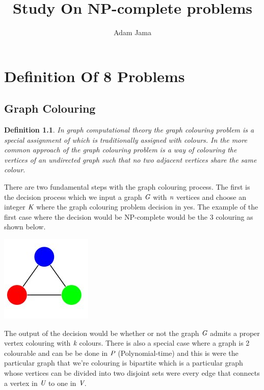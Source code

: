 \documentclass[a4paper]{report}
\newtheorem{defi}{Definition}
\begin{document}
\title{Study On NP-complete problems}
\author{Adam Jama}

\maketitle

\tableofcontents

\chapter{Definition Of 8 Problems}
\label{cha:Definition8}

\section{Graph Colouring}
\label{sec:GraphColouring}

\begin{defi}\label{def:graphcolouring}
In graph computational theory the graph colouring problem is a special assignment of which is traditionally assigned with colours. In the more common approach of the graph colouring problem is a way of colouring the vertices of an undirected graph such that no two adjacent vertices share the same colour.
\end{defi}

There are two fundamental steps with the graph colouring process. The first is the decision process which we input a graph $\emph{G}$ with $\emph{n}$ vertices and choose an integer $\emph{K}$ where the graph colouring problem decision in yes. The example of the first case where the decision would be NP-complete would be the 3 colouring as shown below.



\begin{center}
\includegraphics[scale=0.77]{3colouring.png}
\end{center}

The output of the decision would be whether or not the graph $\emph{G}$ admits a proper vertex colouring with $\emph{k}$ colours. There is also a special case where a graph is 2 colourable and can be be done in $\emph{P}$ (Polynomial-time) and this is were the particular graph that we're colouring is bipartite which is a particular graph whose vertices can be divided into two disjoint sets were every edge that connects a vertex in $\emph{U}$ to one in $\emph{V}$.
\end{document}
